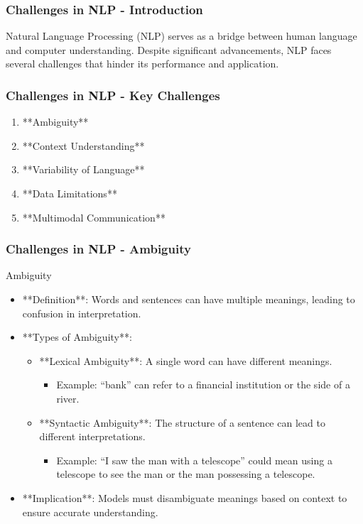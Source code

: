 \documentclass{beamer}
\begin{document}
\begin{frame}[fragile]
    \frametitle{Challenges in NLP - Introduction}
    Natural Language Processing (NLP) serves as a bridge between human language and computer understanding. 
    Despite significant advancements, NLP faces several challenges that hinder its performance and application.
\end{frame}

\begin{frame}[fragile]
    \frametitle{Challenges in NLP - Key Challenges}
    \begin{enumerate}
        \item **Ambiguity**
        \item **Context Understanding**
        \item **Variability of Language**
        \item **Data Limitations**
        \item **Multimodal Communication**
    \end{enumerate}
\end{frame}

\begin{frame}[fragile]
    \frametitle{Challenges in NLP - Ambiguity}
    \begin{block}{Ambiguity}
        \begin{itemize}
            \item **Definition**: Words and sentences can have multiple meanings, leading to confusion in interpretation.
            \item **Types of Ambiguity**:
            \begin{itemize}
                \item **Lexical Ambiguity**: A single word can have different meanings. 
                \begin{itemize}
                    \item Example: “bank” can refer to a financial institution or the side of a river.
                \end{itemize}
                \item **Syntactic Ambiguity**: The structure of a sentence can lead to different interpretations. 
                \begin{itemize}
                    \item Example: “I saw the man with a telescope” could mean using a telescope to see the man or the man possessing a telescope.
                \end{itemize}
            \end{itemize}
            \item **Implication**: Models must disambiguate meanings based on context to ensure accurate understanding.
        \end{itemize}
    \end{block}
\end{frame}
\end{document}
